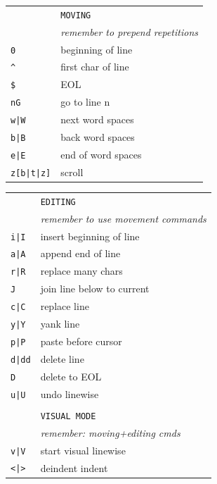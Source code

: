\documentclass[a4paper,12pt]{article}
\begin{document}
\begin{multicols}{2}
\begin{tabular}{ll}
&\texttt{MOVING}\\
&\emph{remember to prepend repetitions}\\
\texttt{0}& beginning of line\\
\texttt{\^{}}& first char of line\\
\texttt{\$}& EOL\\
\texttt{nG}& go to line n\\
\texttt{w|W}& next word \textbar{} spaces\\
\texttt{b|B}& back word \textbar{} spaces\\
\texttt{e|E}& end of word \textbar{} spaces\\
\texttt{z[b|t|z]}& scroll\\
\end{tabular}
\vfill
\begin{tabular}{ll}
&\texttt{EDITING}\\
&\emph{remember to use movement commands}\\
\texttt{i|I}& insert \textbar{} beginning of line\\
\texttt{a|A}& append \textbar{} end of line\\
\texttt{r|R}& replace \textbar{} many chars\\
\texttt{J}& join line below to current\\
\texttt{c|C}& replace \textbar{} line\\
\texttt{y|Y}& yank \textbar{} line\\
\texttt{p|P}& paste \textbar{} before cursor\\
\texttt{d|dd}& delete \textbar{} line\\
\texttt{D}& delete to EOL\\
\texttt{u|U}& undo \textbar{} linewise\\
&\\
&\texttt{VISUAL MODE}\\
&\emph{remember: moving+editing cmds}\\
\texttt{v|V}& start visual \textbar{} linewise\\
\texttt{<|>}& deindent \textbar{} indent\\
\end{tabular}

\vfill


\end{multicols}
\end{document}
